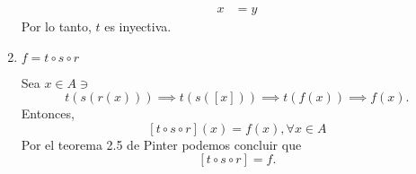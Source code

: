 \begin{problema}
\begin{enumerate}
\begin{dem}
\begin{align*}
					x&=y
				\end{align*}
			Por lo tanto, $t$ es inyectiva. 
					\end{dem}
		\item $f=t\circ s\circ r$
			\begin{dem}
				Sea $x\in A\ni $
				$$t\left(s\left(r(x)\right)\right)\implies t\left(s\left(\left[x\right]\right)\right)\implies t(f(x))\implies f(x).$$
				Entonces, $$\left[t\circ s\circ r\right](x)=f(x),\forall x\in A $$
				Por el teorema 2.5 de Pinter podemos concluir que 
				$$\left[t\circ s\circ r\right]=f.$$
			\end{dem}
	\end{enumerate}
\end{problema}
	




